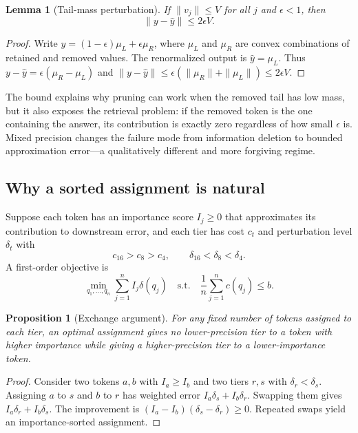 \documentclass[11pt]{article}
\newcommand{\budget}{b}
\theoremstyle{plain}
\newtheorem{lemma}{Lemma}
\newtheorem{proposition}{Proposition}
\theoremstyle{definition}
\begin{document}
\begin{lemma}[Tail-mass perturbation]
If $\|v_j\|\le V$ for all $j$ and $\epsilon<1$, then
\begin{equation}
  \|y-\hat y\|\le 2\epsilon V .
\end{equation}
\end{lemma}
\begin{proof}
Write $y=(1-\epsilon)\mu_L+\epsilon\mu_R$, where $\mu_L$ and $\mu_R$ are convex combinations of retained and removed values.  The renormalized output is $\hat y=\mu_L$.  Thus $y-\hat y=\epsilon(\mu_R-\mu_L)$ and $\|y-\hat y\|\le \epsilon(\|\mu_R\|+\|\mu_L\|)\le 2\epsilon V$.
\end{proof}

The bound explains why pruning can work when the removed tail has low mass, but it also exposes the retrieval problem: if the removed token is the one containing the answer, its contribution is exactly zero regardless of how small $\epsilon$ is.  Mixed precision changes the failure mode from information deletion to bounded approximation error---a qualitatively different and more forgiving regime.

\subsection{Why a sorted assignment is natural}
Suppose each token has an importance score $I_j\ge 0$ that approximates its contribution to downstream error, and each tier has cost $c_t$ and perturbation level $\delta_t$ with
\begin{equation}
 c_{16}>c_8>c_4,
 \qquad
 \delta_{16}<\delta_8<\delta_4 .
\end{equation}
A first-order objective is
\begin{equation}
  \min_{q_1,\ldots,q_n}\sum_{j=1}^{n} I_j\delta(q_j)
  \quad\text{s.t.}\quad
  \frac{1}{n}\sum_{j=1}^{n}c(q_j)\le \budget .
  \label{eq:assignment}
\end{equation}

\begin{proposition}[Exchange argument]
For any fixed number of tokens assigned to each tier, an optimal assignment gives no lower-precision tier to a token with higher importance while giving a higher-precision tier to a lower-importance token.
\end{proposition}
\begin{proof}
Consider two tokens $a,b$ with $I_a\ge I_b$ and two tiers $r,s$ with $\delta_r<\delta_s$.  Assigning $a$ to $s$ and $b$ to $r$ has weighted error $I_a\delta_s+I_b\delta_r$.  Swapping them gives $I_a\delta_r+I_b\delta_s$.  The improvement is $(I_a-I_b)(\delta_s-\delta_r)\ge 0$.  Repeated swaps yield an importance-sorted assignment.
\end{proof}
\end{document}
